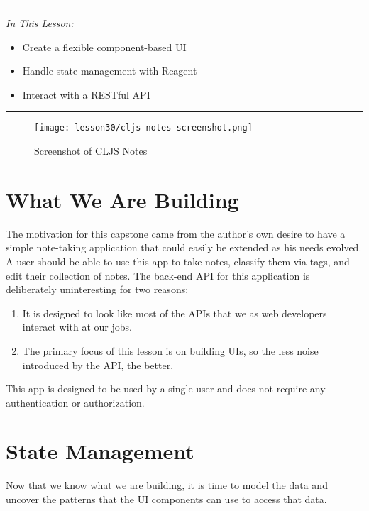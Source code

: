 \documentclass[10pt,twoside,openright]{memoir}
\begin{document}
\begin{center}\rule{0.5\linewidth}{0.5pt}\end{center}

\emph{In This Lesson:}

\begin{itemize}
\tightlist
\item
  Create a flexible component-based UI
\item
  Handle state management with Reagent
\item
  Interact with a RESTful API
\end{itemize}

\begin{center}\rule{0.5\linewidth}{0.5pt}\end{center}

\begin{figure}[H]
\caption{Screenshot of CLJS Notes}
\centering
\texttt{[image: lesson30/cljs-notes-screenshot.png]}
\end{figure}


\section{What We Are Building}

The motivation for this capstone came from the author's own desire to
have a simple note-taking application that could easily be extended as
his needs evolved. A user should be able to use this app to take notes,
classify them via tags, and edit their collection of notes. The back-end
API for this application is deliberately uninteresting for two reasons:

\begin{enumerate}
\def\labelenumi{\arabic{enumi}.}
\tightlist
\item
  It is designed to look like most of the APIs that we as web developers
  interact with at our jobs.
\item
  The primary focus of this lesson is on building UIs, so the less noise
  introduced by the API, the better.
\end{enumerate}

This app is designed to be used by a single user and does not require
any authentication or authorization.


\section{State Management}

Now that we know what we are building, it is time to model the data and
uncover the patterns that the UI components can use to access that data.
\end{document}
